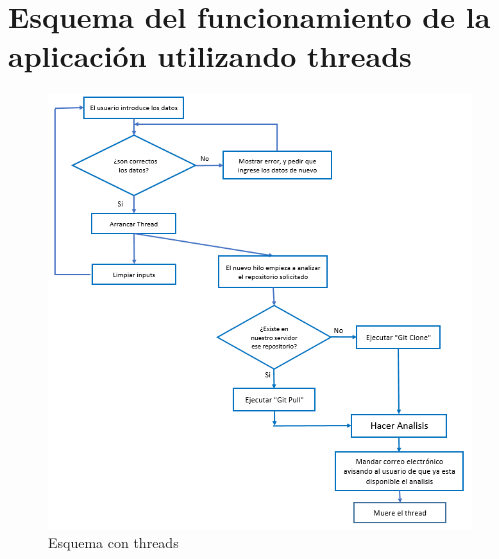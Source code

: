 \documentclass[a4paper, 12pt]{book}
\begin{document}
\section{Esquema del funcionamiento de la aplicación utilizando threads}
\begin{figure}[H]
\centering
\includegraphics[scale=1]{img/DiagramaThread.png} 
\caption{Esquema con threads}
\end{figure}



\cleardoublepage


\end{document}
